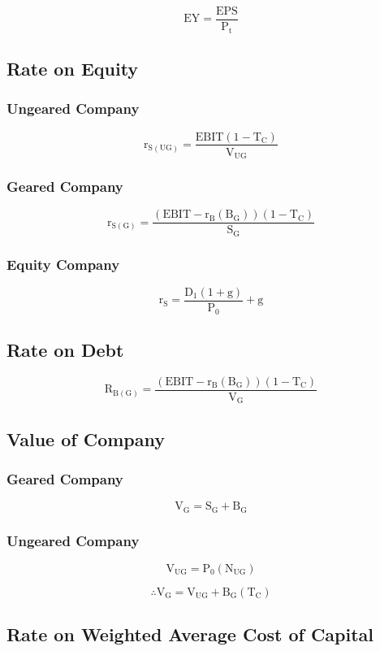 \documentclass[11pt, english]{article}
\begin{document}
	$$\mathrm{EY=\frac{EPS}{P_t}}$$

	\subsection{Rate on Equity}

		\subsubsection{Ungeared Company}

	$$\mathrm{r_{S(UG)}=\frac{EBIT(1-T_C)}{V_{UG}}}$$

		\subsubsection{Geared Company}
	
	$$\mathrm{r_{S(G)}=\frac{(EBIT-r_B(B_G))(1-T_C)}{S_G}}$$

		\subsubsection{Equity Company}

	$$\mathrm{r_S=\frac{D_1(1+g)}{P_0}+g}$$

	\subsection{Rate on Debt}

	$$\mathrm{R_{B(G)}=\frac{(EBIT-r_B(B_G))(1-T_C)}{V_G}}$$
	
	\subsection{Value of Company}

		\subsubsection{Geared Company}

	$$\mathrm{V_G=S_G+B_G}$$

		\subsubsection{Ungeared Company}

	$$\mathrm{V_{UG}=P_0(N_{UG})}$$

	$$\mathrm{\therefore V_G=V_{UG}+B_G(T_C)}$$

	\subsection{Rate on Weighted Average Cost of Capital}
\end{document}
